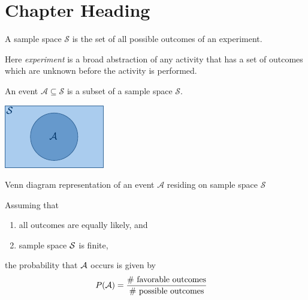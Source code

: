%
%
%

\chapter{Chapter Heading}
\label{intro} %
\begin{multicols}{2}
    \begin{definition}
        A sample space $\mathcal{S}$ is the set of all possible outcomes of an
        experiment.
    \end{definition}

    Here {\em experiment} is a broad abstraction of any activity that has a set
    of outcomes which are unknown before the activity is performed.

    \begin{definition}[Event]
        An event $\mathcal{A}\subseteq \mathcal{S}$ is a subset of a sample
        space $\mathcal{S}$.
    \end{definition}

    \begin{Figure}
    \centering
    \includegraphics[width=0.7\linewidth]{./Graphics/VennDiag_1.pdf}
    \caption{Venn diagram representation of an event $\mathcal{A}$
    residing on sample space $\mathcal{S}$}\label{fig:1}
    \end{Figure}

    \begin{definition}
        Assuming that
        \begin{enumerate}
            \item all outcomes are equally likely, and
            \item sample space $\mathcal{S}$ is finite,
        \end{enumerate}
        the probability that $\mathcal{A}$ occurs is given by
        \begin{align}
            P(\mathcal{A}) &= \dfrac{\text{\# favorable outcomes}}{\text{\# possible
            outcomes}}
        \end{align}
    \end{definition}


\end{multicols}
